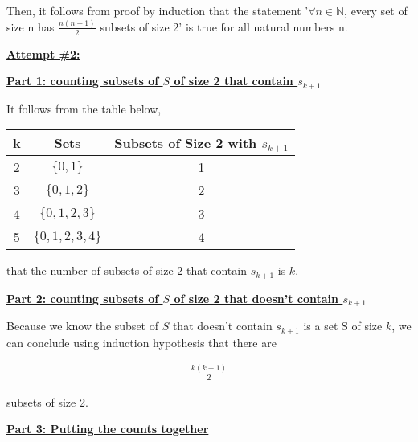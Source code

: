 \documentclass[12pt]{article}
\begin{document}
\begin{enumerate}[a.]
    \bigskip

    Then, it follows from proof by induction that the statement '$\forall n \in \mathbb{N}$,
    every set of size n has $\frac{n(n-1)}{2}$ subsets of size 2' is true for all
    natural numbers n.


    \begin{mdframed}
        \underline{\textbf{Attempt \#2:}}

        \bigskip

        \underline{\textbf{Part 1: counting subsets of $S$ of size 2 that contain $s_{k+1}$}}

        \bigskip

        It follows from the table below,

        \color{red}
        \begin{tabular}{|c|c|c|}
            \hline
            k & Sets & Subsets of Size 2 with $s_{k+1}$\\
            \hline
            2 & $\{0,1\}$ & 1\\
            \hline
            3 & $\{0,1,2\}$ & 2\\
            \hline
            4 & $\{0,1,2,3\}$ & 3\\
            \hline
            5 & $\{0,1,2,3,4\}$ & 4\\
            \hline
        \end{tabular}
        \color{black}

        that the number of subsets of size 2 that contain $s_{k+1}$ is \color{red}\textbf{$k$}\color{black}.

        \bigskip

        \underline{\textbf{Part 2: counting subsets of $S$ of size 2 that doesn't contain $s_{k+1}$}}

        \bigskip

        Because we know the subset of $S$ that doesn't contain $s_{k+1}$ is a set S
        of size $k$, we can conclude using induction hypothesis that there are

        \color{red}
        \begin{align}
            \frac{k(k-1)}{2}
        \end{align}
        \color{black}

        subsets of size 2.

        \bigskip

        \underline{\textbf{Part 3: Putting the counts together}}

        \bigskip


\end{mdframed}
\end{enumerate}
\end{document}
